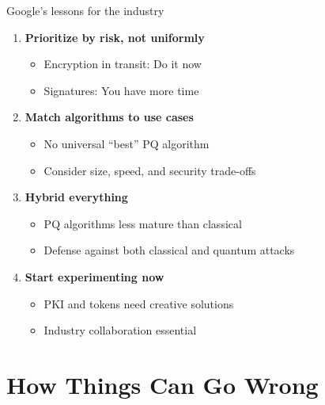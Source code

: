 \documentclass[aspectratio=169, lualatex, handout]{beamer}
\begin{document}
\begin{frame}{Google's lessons for the industry}
	\begin{enumerate}
		\item \textbf{Prioritize by risk, not uniformly}
		      \begin{itemize}
			      \item Encryption in transit: Do it now
			      \item Signatures: You have more time
		      \end{itemize}
		\item \textbf{Match algorithms to use cases}
		      \begin{itemize}
			      \item No universal ``best'' PQ algorithm
			      \item Consider size, speed, and security trade-offs
		      \end{itemize}
		\item \textbf{Hybrid everything}
		      \begin{itemize}
			      \item PQ algorithms less mature than classical
			      \item Defense against both classical and quantum attacks
		      \end{itemize}
		\item \textbf{Start experimenting now}
		      \begin{itemize}
			      \item PKI and tokens need creative solutions
			      \item Industry collaboration essential
		      \end{itemize}
	\end{enumerate}
\end{frame}

\section{How Things Can Go Wrong}
\end{document}
